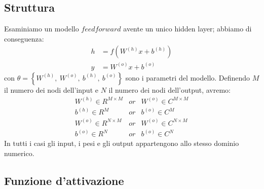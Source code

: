 \documentclass[a4paper,10pt]{article}
\begin{document}
 \subsection{Struttura}
 Esaminiamo un modello $feedforward$ avente un unico hidden layer; abbiamo di conseguenza:
 \begin{align}
  h &= f\left(W^{\left(h\right)}x+b^{\left(h\right)}\right)\\
  y &= W^{\left(o\right)}x+b^{\left(o\right)}
 \end{align}
 con $\theta = \left \{ W^{\left(h\right)}, \ W^{\left(o\right)}, \ b^{\left(h\right)}, \ b^{\left(o\right)}\right \}$ sono i parametri del modello. Definendo $M$ il numero dei nodi dell'input e $N$ il numero dei nodi dell'output, avremo:
 \begin{equation}
  \begin{matrix}
   W^{\left( h\right) } \in R^{M\times M} & or & W^{\left( o\right) } \in C^{M\times M}\\
   b^{\left( h\right) } \in R^M & or & b^{\left( o\right) } \in C^M\\
   W^{\left( o\right) } \in R^{N\times M} & or & W^{\left( o\right) } \in C^{N\times M}\\
   b^{\left( o\right) } \in R^N & or & b^{\left( o\right) } \in C^N
  \end{matrix}
 \end{equation}
 In tutti i casi gli input, i pesi e gli output appartengono allo stesso dominio numerico.
 
 \subsection{Funzione d'attivazione}
 
\end{document}

